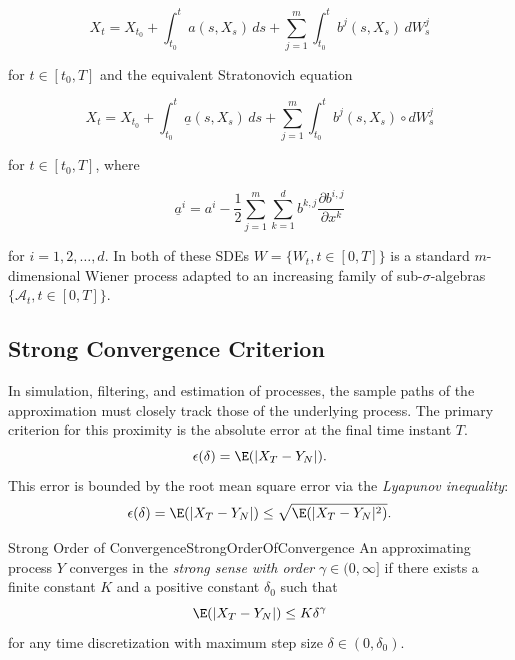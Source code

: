 \begin{equation} \label{eq:MultiDimIto}
    X_t = X_{t_0} + \int_{t_0}^t a(s, X_s) \, ds + \sum_{j=1}^m \int_{t_0}^t b^j(s, X_s) \, dW^j_s
\end{equation}

\noindent for \(t \in [t_0, T]\) and the equivalent Stratonovich equation

\begin{equation} \label{eq:MultiDimStratonovich}
    X_t = X_{t_0} + \int_{t_0}^t \underline{a}(s, X_s) \, ds + \sum_{j=1}^m \int_{t_0}^t b^j(s, X_s) \circ dW^j_s
\end{equation}

\noindent for \(t \in [t_0, T]\), where

\begin{equation} \label{eq:MultiDimCorrection}
    \underline{a}^i = a^i - \frac{1}{2} \sum_{j=1}^m \sum_{k=1}^d b^{k,j} \frac{\partial b^{i,j}}{\partial x^k}
\end{equation}

\noindent for \(i = 1, 2, \dots, d\). In both of these SDEs \(W = \{W_t, t \in [0, T]\}\) is a standard \(m\)-dimensional Wiener process adapted to an increasing family of sub-\(\sigma\)-algebras \(\{\mathcal{A}_t, t \in [0, T]\}\).

\subsection{Strong Convergence Criterion}
In simulation, filtering, and estimation of \Ito{} processes, the sample paths of the approximation must closely track those of the underlying process. The primary criterion for this proximity is the absolute error at the final time instant \(T\).
\begin{equation}
    \epsilon(\delta) = \E(|X_T - Y_N|).
    \label{eq:StrongConvergenceError}
\end{equation}
This error is bounded by the root mean square error via the \textit{Lyapunov inequality}:
\begin{equation}
    \epsilon(\delta) = \E(|X_T - Y_N|) \le \sqrt{\E(|X_T - Y_N|^2)}.
    \label{eq:LyapunovBound}
\end{equation}

\begin{defn}{Strong Order of Convergence}{StrongOrderOfConvergence}
An approximating process \(Y\) converges in the \textit{strong sense with order} \(\gamma \in (0, \infty]\) if there exists a finite constant \(K\) and a positive constant \(\delta_0\) such that
\begin{equation}
    \E(|X_T - Y_N|) \le K \delta^\gamma
    \label{eq:StrongConvergenceOrder}
\end{equation}
for any time discretization with maximum step size \(\delta \in (0, \delta_0)\).
\end{defn}

